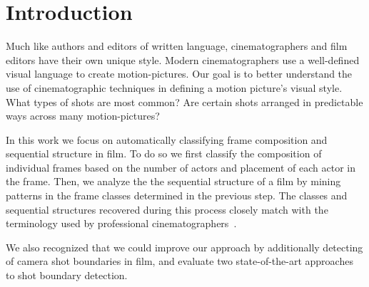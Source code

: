 \section*{Introduction}

Much like authors and editors of written language, cinematographers and film editors have their own unique style.
Modern cinematographers use a well-defined visual language to create motion-pictures. Our goal is to better understand the use of cinematographic techniques in defining a motion picture’s visual style. What types of shots are most common? Are certain shots arranged in predictable ways across many motion-pictures?

In this work we focus on automatically classifying frame composition and sequential structure in film.  To do so we first classify the composition of individual frames based on the number of actors and placement of each actor in the frame.  Then, we analyze the the sequential structure of a film by mining patterns in the frame classes determined in the previous step.  The classes and sequential structures recovered during this process closely match with the terminology used by professional cinematographers~\cite{}.  

We also recognized that we could improve our approach by additionally detecting of camera shot boundaries in film, and evaluate two state-of-the-art approaches to shot boundary detection.